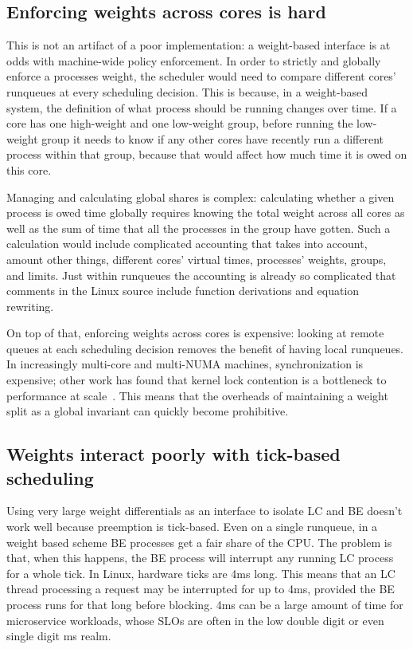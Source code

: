 \subsection{Enforcing weights across cores is
hard}\label{ss:problem:cross-core-hard}

This is not an artifact of a poor implementation: a weight-based interface is at
odds with machine-wide policy enforcement. In order to strictly and globally
enforce a processes weight, the scheduler would need to compare different cores'
runqueues at every scheduling decision. This is because, in a weight-based
system, the definition of what process should be running changes over time. If a
core has one high-weight and one low-weight group, before running the low-weight
group it needs to know if any other cores have recently run a different process
within that group, because that would affect how much time it is owed on this
core.

Managing and calculating global shares is complex: calculating whether a given
process is owed time globally requires knowing the total weight across all cores
as well as the sum of time that all the processes in the group have gotten. Such
a calculation would include complicated accounting that takes into account,
amount other things, different cores' virtual times, processes' weights, groups,
and limits. Just within runqueues the accounting is already so complicated that
comments in the Linux source include function derivations and equation
rewriting.

On top of that, enforcing weights across cores is expensive: looking at remote
queues at each scheduling decision removes the benefit of having local
runqueues. In increasingly multi-core and multi-NUMA machines, synchronization
is expensive; other work has found that kernel lock contention is a bottleneck
to performance at scale~\cite{afaas}. This means that the overheads of
maintaining a weight split as a global invariant can quickly become prohibitive.


\subsection{Weights interact poorly with tick-based
scheduling}\label{ss:problem:quantum}

Using very large weight differentials as an interface to isolate LC and BE
doesn't work well because preemption is tick-based. Even on a single runqueue, in a weight based scheme BE processes get a
fair share of the CPU. The problem is that, when this happens, the BE process
will interrupt any running LC process for a whole tick. In Linux, hardware ticks
are 4ms long. This means that an LC thread processing a request may be
interrupted for up to 4ms, provided the BE process runs for that long before
blocking. 4ms can be a large amount of time for microservice workloads, whose
SLOs are often in the low double digit or even single digit ms
realm.~\cite{in-the-plex, sigmaos}



